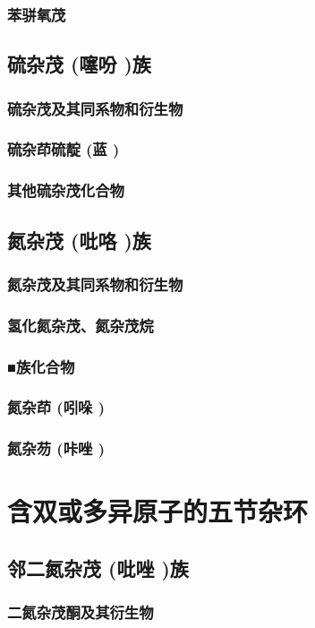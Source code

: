 \documentclass[UTF8]{../03-Chemistry}
\begin{document}
        \subsubsection{苯骈氧茂}
    \subsection{硫杂茂 (噻吩 )族}
        \subsubsection{硫杂茂及其同系物和衍生物}
        \subsubsection{硫杂茚硫靛 (蓝 )}
        \subsubsection{其他硫杂茂化合物}
    \subsection{氮杂茂 (吡咯 )族}
        \subsubsection{氮杂茂及其同系物和衍生物}
        \subsubsection{氢化氮杂茂、氮杂茂烷}
        \subsubsection{■族化合物}
        \subsubsection{氮杂茚 (吲哚 )}
        \subsubsection{氮杂芴 (咔唑 )}
\section{含双或多异原子的五节杂环}
    \subsection{邻二氮杂茂 (吡唑 )族}
        \subsubsection{二氮杂茂酮及其衍生物}
\end{document}
